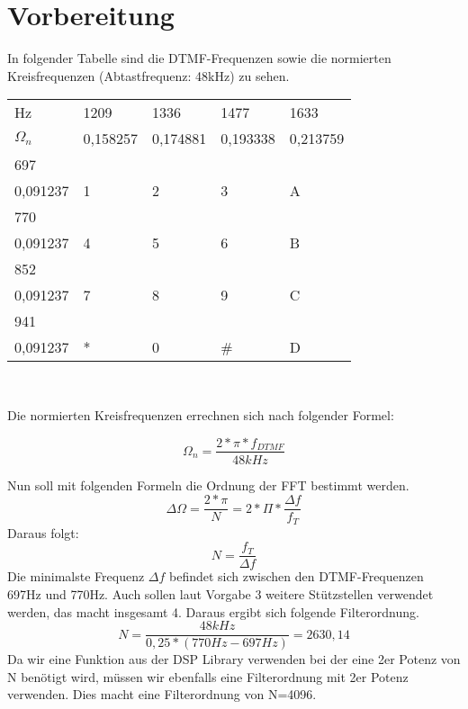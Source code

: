 \chapter{Vorbereitung}
In folgender Tabelle sind die DTMF-Frequenzen sowie die normierten Kreisfrequenzen (Abtastfrequenz: 48kHz) zu sehen.\\

\begin{table}[H]
	
\centering
\begin{tabular}{l|l|l|l|l}
	Hz & 1209 & 1336 & 1477 & 1633 \\
	\begin{math}\Omega_n\end{math}  & 0,158257 & 0,174881 & 0,193338 & 0,213759\\
	\hline\hline 
	697 & & & & \\
	0,091237 & 1 & 2 & 3 & A \\
	\hline
	770 & & & & \\
	0,091237 & 4 & 5 & 6 & B \\
	\hline
	852 & & & & \\
	0,091237 & 7 & 8 & 9 & C \\
	\hline
	941 & & & & \\
	0,091237 & * & 0 & \# & D \\
	\hline
\end{tabular}\\
\end{table}

Die normierten Kreisfrequenzen errechnen sich nach folgender Formel:


\begin{equation}
  \Omega_n=\frac{2*\pi*f_{DTMF}}{48kHz}
\end{equation}

Nun soll mit folgenden Formeln die Ordnung der FFT bestimmt werden. 
\begin{equation}
  \Delta\Omega=\frac{2*\pi}{N}=2*\Pi*\frac{\Delta f}{f_T}
\end{equation}
Daraus folgt:
\begin{equation}
  N=\frac{f_T}{\Delta f}
\end{equation}
Die minimalste Frequenz \begin{math}\Delta f\end{math} befindet sich zwischen den DTMF-Frequenzen 697Hz und 770Hz.
Auch sollen laut Vorgabe 3 weitere St\"utzstellen verwendet werden, das macht insgesamt 4.
Daraus ergibt sich folgende Filterordnung.
\begin{equation}
  N=\frac{48kHz}{0,25*(770Hz-697Hz)}=2630,14
\end{equation}
Da wir eine Funktion aus der DSP Library verwenden bei der eine 2er Potenz von N ben\"otigt wird, m\"ussen wir ebenfalls eine Filterordnung mit 2er Potenz verwenden.
Dies macht eine Filterordnung von N=4096.